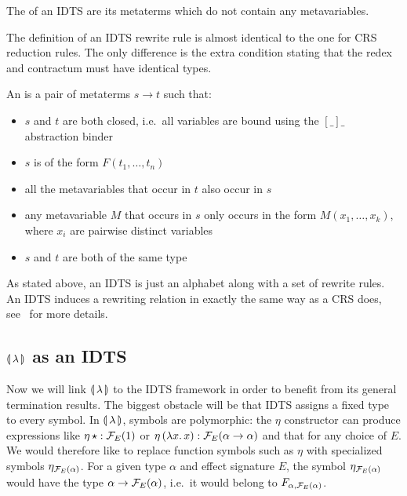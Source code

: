 \begin{definition}
  The  of an IDTS are its metaterms which do not contain any
  metavariables.
\end{definition}

The definition of an IDTS rewrite rule is almost identical to the one for
CRS reduction rules. The only difference is the extra condition stating
that the redex and contractum must have identical types.

\begin{definition}
  An  is a pair of metaterms $s \to t$ such that:
  \begin{itemize}
  \item $s$ and $t$ are both closed, i.e.\ all variables are bound using
    the $[\_]\_$ abstraction binder
  \item $s$ is of the form $F(t_1,\ldots,t_n)$
  \item all the metavariables that occur in $t$ also occur in $s$
  \item any metavariable $M$ that occurs in $s$ only occurs in the form
    $M(x_1,\ldots,x_k)$, where $x_i$ are pairwise distinct variables
  \item $s$ and $t$ are both of the same type
  \end{itemize}
\end{definition}

As stated above, an IDTS is just an alphabet along with a set of rewrite
rules. An IDTS induces a rewriting relation in exactly the same way as a
CRS does, see~\cite{blanqui2000termination} for more details.


\subsection{\texorpdfstring{$\llparenthesis \, \lambda \, \rrparenthesis$}{Our Calculus} as an IDTS}
\label{ssec:banana-idts}

Now we will link $\llparenthesis \, \lambda \, \rrparenthesis$ to the IDTS framework in order to
benefit from its general termination results. The biggest obstacle will be
that IDTS assigns a fixed type to every symbol. In $\llparenthesis \, \lambda \, \rrparenthesis$,
symbols are polymorphic: the $\eta$ constructor can produce expressions
like $\eta\,\star : \mathcal{F}_E(1)$ or
$\eta\,(\lambda x.\, x) : \mathcal{F}_E(\alpha \to \alpha)$ and that for any choice of
$E$. We would therefore like to replace function symbols such as $\eta$
with specialized symbols $\eta_{\mathcal{F}_E(\alpha)}$. For a given type $\alpha$
and effect signature $E$, the symbol $\eta_{\mathcal{F}_E(\alpha)}$ would have the
type $\alpha \to \mathcal{F}_E(\alpha)$, i.e.\ it would belong to
$F_{\alpha,\mathcal{F}_E(\alpha)}$.


